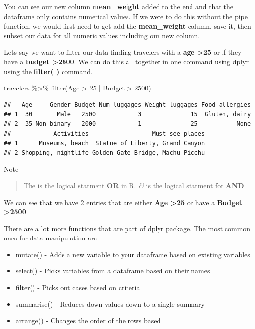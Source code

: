 \documentclass[
]{book}
\newenvironment{Shaded}{\begin{snugshade}}{\end{snugshade}}
\newcommand{\DecValTok}[1]{\textcolor[rgb]{0.00,0.00,0.81}{#1}}
\newcommand{\FunctionTok}[1]{\textcolor[rgb]{0.00,0.00,0.00}{#1}}
\newcommand{\NormalTok}[1]{#1}
\newcommand{\SpecialCharTok}[1]{\textcolor[rgb]{0.00,0.00,0.00}{#1}}
\begin{document}
You can see our new column \textbf{mean\_weight} added to the end and that the dataframe only contains numerical values. If we were to do this without the pipe function, we would first need to get add the \textbf{mean\_weight} column, save it, then subset our data for all numeric values including our new column.

Lets say we want to filter our data finding travelers with a \textbf{age \textgreater25} or if they have a \textbf{budget \textgreater2500}. We can do this all together in one command using dplyr using the \textbf{filter( )} command.

\begin{Shaded}
\begin{Highlighting}[]
\NormalTok{travelers }\SpecialCharTok{\%\textgreater{}\%} 
  \FunctionTok{filter}\NormalTok{(Age }\SpecialCharTok{\textgreater{}} \DecValTok{25} \SpecialCharTok{|}\NormalTok{ Budget }\SpecialCharTok{\textgreater{}} \DecValTok{2500}\NormalTok{)}
\end{Highlighting}
\end{Shaded}

\begin{verbatim}
##   Age     Gender Budget Num_luggages Weight_luggages Food_allergies
## 1  30       Male   2500            3              15  Gluten, dairy
## 2  35 Non-binary   2000            1              25           None
##            Activities                  Must_see_places
## 1      Museums, beach  Statue of Liberty, Grand Canyon
## 2 Shopping, nightlife Golden Gate Bridge, Machu Picchu
\end{verbatim}

Note

\begin{quote}
The \emph{\textbar{}} is the logical statment \textbf{OR} in R. \emph{\&} is the logical statment for \textbf{AND}
\end{quote}

We can see that we have 2 entries that are either \textbf{Age \textgreater25} or have a \textbf{Budget \textgreater2500}

There are a lot more functions that are part of dplyr package. The most common ones for data manipulation are

\begin{itemize}
\item
  mutate() - Adds a new variable to your dataframe based on existing variables
\item
  select() - Picks variables from a dataframe based on their names
\item
  filter() - Picks out cases based on criteria
\item
  summarise() - Reduces down values down to a single summary
\item
  arrange() - Changes the order of the rows based
\end{itemize}
\end{document}
